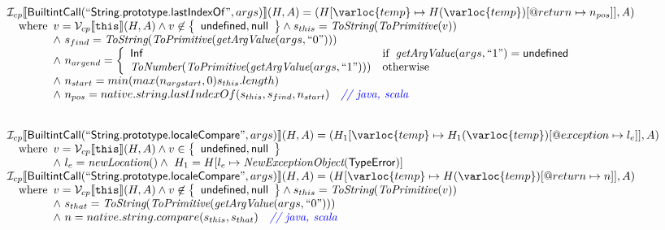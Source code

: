 \[\begin{array}{l}
\I _{cp}\lbr \SF{BuiltintCall}(``\SF{String.prototype.lastIndexOf}",args)\rbr(H,A)
 = (H[\varloc{temp}\mapsto H(\varloc{temp})[\varprop{return}\mapsto n_{pos}]], A) \\
\quad\wherec{
  v = \V _{cp}\lbr \TT{this}\rbr (H,A) \land v \not\in \set{\SF{undefined}, \SF{null}}
  \land s_{this} = \hf{ToString}(\hf{ToPrimitive}(v))\\
  \land\ s_{find} = \hf{ToString}(\hf{ToPrimitive}(\hf{getArgValue}(args, ``0")))\\
  \land\ n_{argend} = \left\{\begin{array}{ll}
      \SF{Inf} & \ifc{\hf{getArgValue}(args, ``1") = \SF{undefined}}\\
      \hf{ToNumber}(\hf{ToPrimitive}(\hf{getArgValue}(args, ``1"))) & \owc\\
    \end{array}\right.\\
  \land\ n_{start} = min(max(n_{argstart}, 0) s_{this}.length)\\
  \land\ n_{pos} = native.string.lastIndexOf(s_{this}, s_{find}, n_{start}) \quad\comment{{\inblue // java, scala}}\\
  }\\
\\\\
  
  
  
\I _{cp}\lbr \SF{BuiltintCall}(``\SF{String.prototype.localeCompare}",args)\rbr(H,A)
 = (H_1[\varloc{temp}\mapsto H_1(\varloc{temp})[\varprop{exception}\mapsto l_e]], A) \\
\quad\wherec{
  v = \V _{cp}\lbr \TT{this}\rbr (H,A) \land v \in \set{\SF{undefined}, \SF{null}}\\
  \land\ l_e = \hf{newLocation}() \land\ H_1=H[l_e\mapsto\hf{NewExceptionObject}(\SF{TypeError})] 
  }\\
  
\I _{cp}\lbr \SF{BuiltintCall}(``\SF{String.prototype.localeCompare}",args)\rbr(H,A)
 = (H[\varloc{temp}\mapsto H(\varloc{temp})[\varprop{return}\mapsto n]], A) \\
\quad\wherec{
  v = \V _{cp}\lbr \TT{this}\rbr (H,A) \land v \not\in \set{\SF{undefined}, \SF{null}}
  \land s_{this} = \hf{ToString}(\hf{ToPrimitive}(v))\\
  \land\ s_{that} = \hf{ToString}(\hf{ToPrimitive}(\hf{getArgValue}(args, ``0")))\\
  \land\ n = native.string.compare(s_{this}, s_{that})\quad\comment{{\inblue // java, scala}}\\
  }\\
\\\\



\end{array}\]
